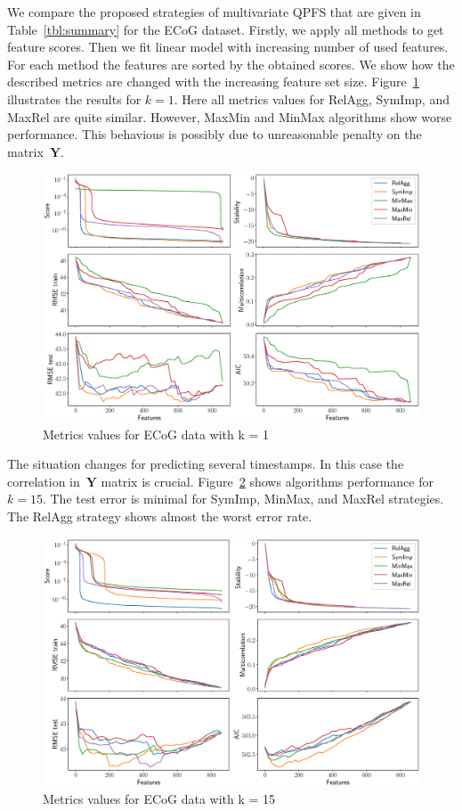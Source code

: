 \documentclass[12pt,twoside]{article}
\theoremstyle{definition}
\newcommand{\bY}{\mathbf{Y}}
\begin{document}
We compare the proposed strategies of multivariate QPFS that are given in Table~\ref{tbl:summary} for the ECoG dataset. 
Firstly, we apply all methods to get feature scores. 
Then we fit linear model with increasing number of used features. 
For each method the features are sorted by the obtained scores. 
We show how the described metrics are changed with the increasing feature set size. 
Figure~\ref{fig:ecog_3_1_metrics} illustrates the results for $k = 1$. 
Here all metrics values for RelAgg, SymImp, and MaxRel are quite similar. 
However, MaxMin and MinMax algorithms show worse performance. 
This behavious is possibly due to unreasonable penalty on the matrix~$\bY$.
\begin{figure}[h]
	\includegraphics[width=\linewidth]{figs/ecog_3_1_metrics.eps}
	\caption{Metrics values for ECoG data with k = 1}
	\label{fig:ecog_3_1_metrics}
\end{figure}

The situation changes for predicting several timestamps. 
In this case the correlation in~$\bY$ matrix is crucial. 
Figure~\ref{fig:ecog_3_15_metrics} shows algorithms performance for $k = 15$. 
The test error is minimal for SymImp, MinMax, and MaxRel strategies.  
The RelAgg strategy shows almost the worst error rate.

\begin{figure}[h]
	\includegraphics[width=\linewidth]{figs/ecog_3_15_metrics.eps}
	\caption{Metrics values for ECoG data with k = 15}
	\label{fig:ecog_3_15_metrics}
\end{figure}
\end{document}
